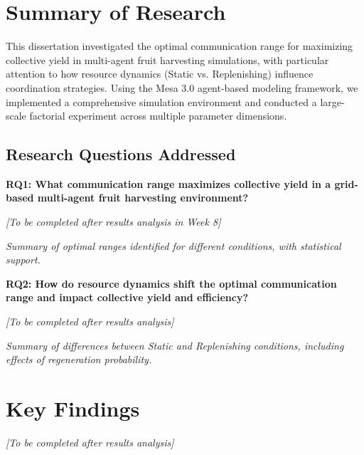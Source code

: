 
\section{Summary of Research}

This dissertation investigated the optimal communication range for maximizing collective yield in multi-agent fruit harvesting simulations, with particular attention to how resource dynamics (Static vs. Replenishing) influence coordination strategies. Using the Mesa 3.0 agent-based modeling framework, we implemented a comprehensive simulation environment and conducted a large-scale factorial experiment across multiple parameter dimensions.

\subsection{Research Questions Addressed}

\textbf{RQ1: What communication range maximizes collective yield in a grid-based multi-agent fruit harvesting environment?}

\textit{[To be completed after results analysis in Week 8]}

\textit{Summary of optimal ranges identified for different conditions, with statistical support.}

\textbf{RQ2: How do resource dynamics shift the optimal communication range and impact collective yield and efficiency?}

\textit{[To be completed after results analysis]}

\textit{Summary of differences between Static and Replenishing conditions, including effects of regeneration probability.}

\section{Key Findings}

\textit{[To be completed after results analysis]}

